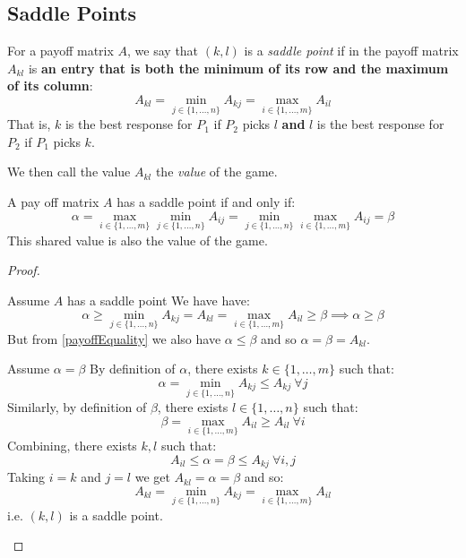 \documentclass[../main.tex]{subfiles}
\begin{document}
\subsection{Saddle Points}
\begin{definition}
  For a payoff matrix $A$, we say that $(k, l)$ is a \textit{saddle point} if in the payoff matrix $A_{k l}$ is \textbf{an entry that is both the minimum of its row and the maximum of its column}:
  \[
    A_{k l} = \min_{j \in \{1, \ldots, n\}} A_{k j} = \max_{i \in \{1, \ldots, m\}} A_{i l}
  \]
  That is, $k$ is the best response for $P_1$ if $P_2$ picks $l$ \textbf{and} $l$ is the best response for $P_2$ if $P_1$ picks $k$.

  We then call the value $A_{k l}$ the \textit{value} of the game.
\end{definition}
\begin{proposition}
  A pay off matrix $A$ has a saddle point if and only if:
  \[
    \alpha = \max_{i \in \{1, \ldots, m\}} \min_{j \in \{1, \ldots, n\}} A_{i j} = \min_{j \in \{1, \ldots, n\}} \max_{i \in \{1, \ldots, m\}} A_{i j} = \beta
  \]
  This shared value is also the value of the game.
\end{proposition}
\begin{proof}
  \nonexaminable
  \begin{proofdirection}{Assume $A$ has a saddle point}
    We have have:
    \[
      \alpha \geq \min_{j \in \{1, \ldots, n\}} A_{k j} = A_{k l} = \max_{i \in \{1, \ldots, m\}} A_{i l} \geq \beta \implies \alpha \geq \beta
    \]
    But from \cref{payoffEquality} we also have $\alpha \leq \beta$ and so $\alpha = \beta = A_{k l}$.
  \end{proofdirection}
  \begin{proofdirection}{Assume $\alpha = \beta$}
    By definition of $\alpha$, there exists $k \in \{1, \ldots, m\}$ such that:
    \[
      \alpha = \min_{j \in \{1, \ldots, n\}} A_{k j} \leq A_{k j}\ \forall j
    \]
    Similarly, by definition of $\beta$, there exists $l \in \{1, \ldots, n\}$ such that:
    \[
      \beta = \max_{i \in \{1, \ldots, m\}} A_{i l} \geq A_{i l}\ \forall i
    \]
    Combining, there exists $k, l$ such that:
    \[
      A_{i l} \leq \alpha = \beta \leq A_{k j}\ \forall i, j
    \]
    Taking $i = k$ and $j = l$ we get $A_{k l} = \alpha = \beta$ and so:
    \[
      A_{k l} = \min_{j \in \{1, \ldots, n\}} A_{k j} = \max_{i \in \{1, \ldots, m\}} A_{i l}
    \]
    i.e. $(k, l)$ is a saddle point.
  \end{proofdirection}
\end{proof}
\end{document}
